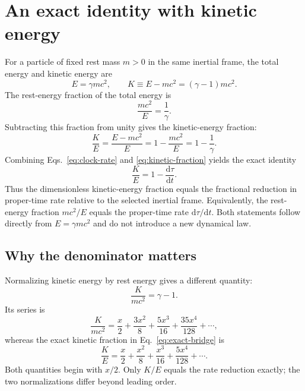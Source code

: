 \documentclass[12pt]{article}
\begin{document}
\section{An exact identity with kinetic energy}

For a particle of fixed rest mass $m>0$ in the same inertial frame, the total energy and kinetic energy are
\begin{equation}
  E=\gamma mc^2,
  \qquad
  K\equiv E-mc^2=(\gamma-1)mc^2.
  \label{eq:energy-definitions}
\end{equation}
The rest-energy fraction of the total energy is
\begin{equation}
  \frac{mc^2}{E}=\frac{1}{\gamma}.
  \label{eq:rest-fraction}
\end{equation}
Subtracting this fraction from unity gives the kinetic-energy fraction:
\begin{equation}
  \frac{K}{E}
  =\frac{E-mc^2}{E}
  =1-\frac{mc^2}{E}
  =1-\frac{1}{\gamma}.
  \label{eq:kinetic-fraction}
\end{equation}
Combining Eqs.~\eqref{eq:clock-rate} and \eqref{eq:kinetic-fraction} yields the exact identity
\begin{equation}
  \boxed{\frac{K}{E}
  =1-\frac{\mathrm{d}\tau}{\mathrm{d}t}.}
  \label{eq:exact-bridge}
\end{equation}
Thus the dimensionless kinetic-energy fraction equals the fractional reduction in proper-time rate relative to the selected inertial frame. Equivalently, the rest-energy fraction $mc^2/E$ equals the proper-time rate $\mathrm{d}\tau/\mathrm{d}t$. Both statements follow directly from $E=\gamma mc^2$ and do not introduce a new dynamical law.

\subsection{Why the denominator matters}

Normalizing kinetic energy by rest energy gives a different quantity:
\begin{equation}
  \frac{K}{mc^2}=\gamma-1.
  \label{eq:kinetic-over-rest}
\end{equation}
Its series is
\begin{equation}
  \frac{K}{mc^2}
  =\frac{x}{2}+\frac{3x^2}{8}+\frac{5x^3}{16}
    +\frac{35x^4}{128}+\cdots,
  \label{eq:kinetic-over-rest-series}
\end{equation}
whereas the exact kinetic fraction in Eq.~\eqref{eq:exact-bridge} is
\begin{equation}
  \frac{K}{E}
  =\frac{x}{2}+\frac{x^2}{8}+\frac{x^3}{16}
    +\frac{5x^4}{128}+\cdots.
  \label{eq:kinetic-over-total-series}
\end{equation}
Both quantities begin with $x/2$. Only $K/E$ equals the rate reduction exactly; the two normalizations differ beyond leading order.
\end{document}
